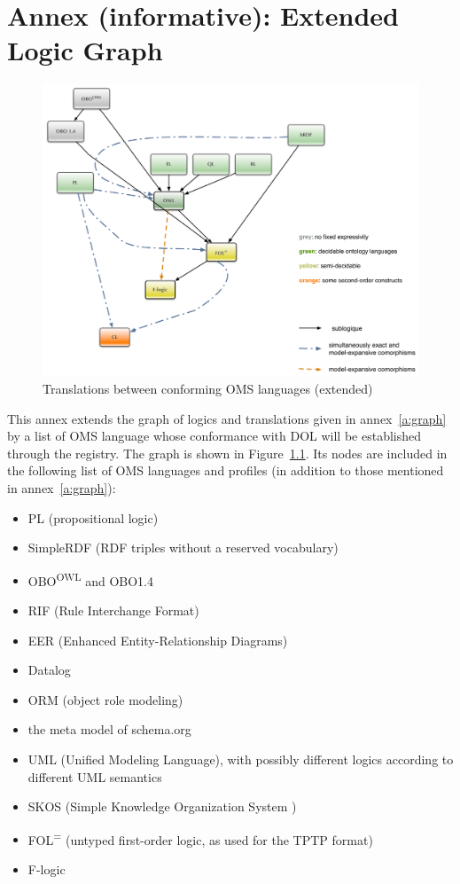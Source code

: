 \documentclass[10pt,fleqn,%
\ifpretendfinal
final%
\else
draft%
\fi,
]{scrreprt}
\newcommand{\annexrefname}{annex}
\newcommand{\figurerefname}{Figure}
\newcommand{\aref}[1]{\annexrefname~\ref{#1}}
\newcommand{\fref}[1]{\figurerefname~\ref{#1}}
\newcommand{\infannex}[1]{ \chapter{Annex (informative): #1} }
\begin{document}
\infannex{Extended Logic Graph}\label{a:ext-graph}

\begin{figure}
  \centering
  \includegraphics[width=\textwidth]{illustrations/pre-reduced-ontograph}
  \caption{Translations between conforming OMS languages (extended)}
  \label{fig:pre-ontograph}
\end{figure}
This annex extends the graph of logics and translations given in
\aref{a:graph} by a list of OMS language whose conformance with
DOL will be established through the registry.  The graph is shown in
\fref{fig:pre-ontograph}.  Its nodes are included in the following
list of OMS languages and profiles (in addition to those
mentioned in \aref{a:graph}):
\begin{itemize}
\item PL (propositional logic)
\item SimpleRDF (RDF triples without a reserved vocabulary)
\item OBO\textsuperscript{OWL} and OBO1.4
\item RIF (Rule Interchange Format)
\item EER (Enhanced Entity-Relationship Diagrams) %
\item Datalog
\item ORM (object role modeling)
\item the meta model of schema.org
\item UML (Unified Modeling Language), with possibly different logics according to different
UML semantics
\item SKOS (Simple Knowledge Organization System )
\item FOL\textsuperscript{=} (untyped first-order logic, as used for the
TPTP format)
\item F-logic
\end{itemize}
\end{document}
